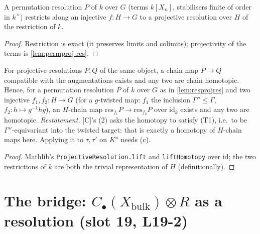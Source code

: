 \begin{lemma}\label{lem:resprojres}
  \leanok
  A permutation resolution $P$ of $k$ over $G$ (terms $k[X_n]$, stabilisers finite of order in $k^\times$) restricts along
  an injective $f:H\to G$ to a projective resolution over $H$ of the restriction of $k$.
\end{lemma}
\begin{proof}
  \leanok
  Restriction is exact (it preserves limits and colimits); projectivity of the terms is \ref{lem:permproj-res}.
\end{proof}

\begin{theorem}\label{lem:tauexists-2-abs}
  \leanok
  For projective resolutions $P,Q$ of the same object, a chain map $P\to Q$ compatible with the augmentations exists and
  any two are chain homotopic. Hence, for a permutation resolution $P$ of $k$ over $G$ as in \ref{lem:resprojres} and two
  injective $f_1,f_2:H\to G$ (for a $g$-twisted map: $f_1$ the inclusion $\Gamma''\le\Gamma$, $f_2:h\mapsto g^{-1}hg$), an
  $H$-chain map $\mathrm{res}_{f_1}P\to\mathrm{res}_{f_2}P$ over $\mathrm{id}_k$ exists and any two are homotopic.
  \emph{Restatement.} [C]'s (2) asks the homotopy to satisfy (T1), i.e.\ to be $\Gamma''$-equivariant into the twisted
  target: that is exactly a homotopy of $H$-chain maps here. Applying it to $\tau,\tau'$ on $K^u$ needs (c).
\end{theorem}
\begin{proof}
  \leanok
  Mathlib's \texttt{ProjectiveResolution.lift} and \texttt{liftHomotopy} over $\mathrm{id}$; the two restrictions of
  $k$ are both the trivial representation of $H$ (definitionally).
\end{proof}

\section{The bridge: \texorpdfstring{$C_\bullet(X_{\mathrm{bulk}})\otimes R$}{C(X\_bulk) (x) R} as a resolution (slot 19, L19-2)}

